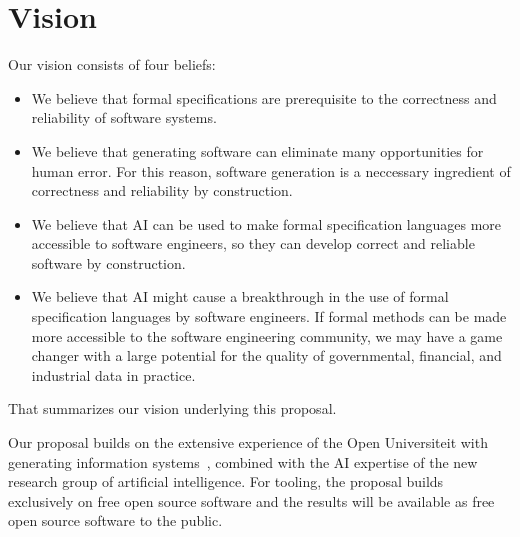\documentclass{elsarticle}
\begin{document}
\section{Vision}
    Our vision consists of four beliefs:
\begin{itemize}
\item 
    We believe that formal specifications are prerequisite to the correctness and reliability of software systems.
\item 
    We believe that generating software can eliminate many opportunities for human error.
    For this reason, software generation is a neccessary ingredient of correctness and reliability by construction.
\item 
    We believe that AI can be used to make formal specification languages more accessible to software engineers,
    so they can develop correct and reliable software by construction.
\item 
    We believe that AI might cause a breakthrough in the use of formal specification languages by software engineers.
    If formal methods can be made more accessible to the software engineering community,
    we may have a game changer with a large potential for the quality of governmental, financial, and industrial data in practice.
\end{itemize}
    That summarizes our vision underlying this proposal.

    Our proposal builds on the extensive experience of the Open Universiteit with
    generating information systems~\cite{JoostenRAMiCS2017,Joosten-JLAMP2018,Steenvoorden2022,10.1145/3354166.3354182},
    combined with the AI expertise of the new research group of artificial intelligence.
    For tooling, the proposal builds exclusively on free open source software
    and the results will be available as free open source software to the public.
\end{document}
